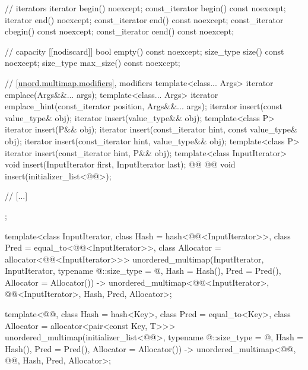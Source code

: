 \documentclass{wg21}
\begin{document}
\begin{codeblock}
{{        // iterators
        iterator       begin() noexcept;
        const_iterator begin() const noexcept;
        iterator       end() noexcept;
        const_iterator end() const noexcept;
        const_iterator cbegin() const noexcept;
        const_iterator cend() const noexcept;
        
        // capacity
        [[nodiscard]] bool empty() const noexcept;
        size_type size() const noexcept;
        size_type max_size() const noexcept;
        
        // \ref{unord.multimap.modifiers}, modifiers
        template<class... Args> iterator emplace(Args&&... args);
        template<class... Args> iterator emplace_hint(const_iterator position, Args&&... args);
        iterator insert(const value_type& obj);
        iterator insert(value_type&& obj);
        template<class P> iterator insert(P&& obj);
        iterator insert(const_iterator hint, const value_type& obj);
        iterator insert(const_iterator hint, value_type&& obj);
        template<class P> iterator insert(const_iterator hint, P&& obj);
        template<class InputIterator> void insert(InputIterator first, InputIterator last);
        @@
        @@
        void insert(initializer_list<@@>);
        
        // [...]
    };
    
    template<class InputIterator,
    class Hash = hash<@@<InputIterator>>,
    class Pred = equal_to<@@<InputIterator>>,
    class Allocator = allocator<@@<InputIterator>>>
    unordered_multimap(InputIterator, InputIterator,
    typename @\seebelow@::size_type = @\seebelow@,
    Hash = Hash(), Pred = Pred(), Allocator = Allocator())
    -> unordered_multimap<@@<InputIterator>, @@<InputIterator>,
    Hash, Pred, Allocator>;
    
    template<@@, class Hash = hash<Key>,
    class Pred = equal_to<Key>, class Allocator = allocator<pair<const Key, T>>>
    unordered_multimap(initializer_list<@@>,
    typename @\seebelow@::size_type = @\seebelow@,
    Hash = Hash(), Pred = Pred(), Allocator = Allocator())
    -> unordered_multimap<@@, @@, Hash, Pred, Allocator>;
    
}
\end{codeblock}
\end{document}
